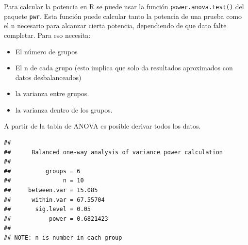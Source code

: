 \documentclass[]{book}
\newenvironment{Shaded}{\begin{snugshade}}{\end{snugshade}}
\newcommand{\CommentTok}[1]{\textcolor[rgb]{0.56,0.35,0.01}{\textit{#1}}}
\newcommand{\DataTypeTok}[1]{\textcolor[rgb]{0.13,0.29,0.53}{#1}}
\newcommand{\DecValTok}[1]{\textcolor[rgb]{0.00,0.00,0.81}{#1}}
\newcommand{\FloatTok}[1]{\textcolor[rgb]{0.00,0.00,0.81}{#1}}
\newcommand{\KeywordTok}[1]{\textcolor[rgb]{0.13,0.29,0.53}{\textbf{#1}}}
\newcommand{\NormalTok}[1]{#1}
\newcommand{\OperatorTok}[1]{\textcolor[rgb]{0.81,0.36,0.00}{\textbf{#1}}}
\newcommand{\StringTok}[1]{\textcolor[rgb]{0.31,0.60,0.02}{#1}}
\providecommand{\tightlist}{%
  \setlength{\itemsep}{0pt}\setlength{\parskip}{0pt}}
\theoremstyle{definition}
\theoremstyle{definition}
\theoremstyle{definition}
\theoremstyle{remark}
\begin{document}
Para calcular la potencia en R se puede usar la función
\texttt{power.anova.test()} del paquete \texttt{pwr}. Esta función puede
calcular tanto la potencia de una prueba como el n necesario para
alcanzar cierta potencia, dependiendo de que dato falte completar. Para
eso necesita:

\begin{itemize}
\tightlist
\item
  El número de grupos
\item
  El n de cada grupo (esto implica que solo da resultados aproximados
  con datos desbalanceados)
\item
  la varianza entre grupos.
\item
  la varianza dentro de los grupos.
\end{itemize}

A partir de la tabla de ANOVA es posible derivar todos los datos.

\begin{Shaded}
\end{Shaded}

\begin{verbatim}
## 
##      Balanced one-way analysis of variance power calculation 
## 
##          groups = 6
##               n = 10
##     between.var = 15.085
##      within.var = 67.55704
##       sig.level = 0.05
##           power = 0.6821423
## 
## NOTE: n is number in each group
\end{verbatim}
\end{document}
